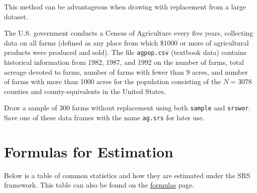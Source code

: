 \documentclass[
  letterpaper,
  DIV=11,
  numbers=noendperiod]{scrartcl}
\begin{document}
This method can be advantageous when drawing with replacement from a
large dataset.

\begin{tcolorbox}[enhanced jigsaw, toptitle=1mm, breakable, colframe=quarto-callout-warning-color-frame, colbacktitle=quarto-callout-warning-color!10!white, left=2mm, titlerule=0mm, bottomtitle=1mm, title={You try it}, bottomrule=.15mm, rightrule=.15mm, arc=.35mm, toprule=.15mm, colback=white, opacityback=0, leftrule=.75mm, coltitle=black, opacitybacktitle=0.6]

The U.S. government conducts a Census of Agriculture every five years,
collecting data on all farms (defined as any place from which \$1000 or
more of agricultural products were produced and sold). The file
\texttt{agpop.csv} (textbook data) contains historical information from
1982, 1987, and 1992 on the number of farms, total acreage devoted to
farms, number of farms with fewer than 9 acres, and number of farms with
more than 1000 acres for the population consisting of the \(N=3078\)
counties and county-equivalents in the United States.

Draw a sample of 300 farms without replacement using both
\texttt{sample} and \texttt{srswor}. Save one of these data frames with
the name \texttt{ag.srs} for later use.

\end{tcolorbox}

\hypertarget{formulas-for-estimation}{%
\section{Formulas for Estimation}\label{formulas-for-estimation}}

Below is a table of common statistics and how they are estimated under
the SRS framework. This table can also be found on the
\href{https://sampling-458.netlify.app/notes/formulas.html}{formulas}
page.
\end{document}
